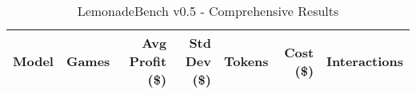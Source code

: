 \begin{table}[h]
\centering
\caption{LemonadeBench v0.5 - Comprehensive Results}
\label{tab:lemonadebench_v05_comprehensive}
\begin{tabular}{|l|r|r|r|r|r|r|}
\hline
\textbf{Model} & \textbf{Games} & \textbf{Avg Profit (\$)} & \textbf{Std Dev (\$)} & \textbf{Tokens} & \textbf{Cost (\$)} & \textbf{Interactions} \\
\hline
\end{tabular}
\end{table}